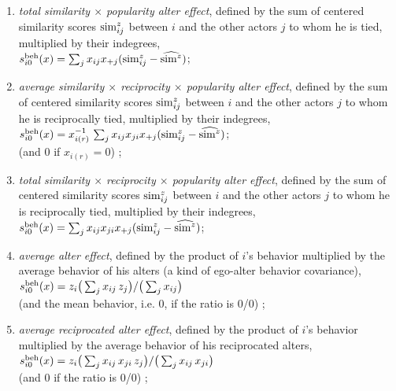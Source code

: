 \documentclass[a4paper,fleqn]{article}
\newcommand{\+}{\, + \,}
\newcommand{\vit}{\theenumi}
\begin{document}
{\begin{enumerate}
 \item
 {\em total similarity  $\times$ popularity alter effect}, defined by the
 sum of centered similarity scores ${\rm sim}^z_{ij}$ between $i$
 and the other actors $j$ to whom he is tied, multiplied by their indegrees,\\
 $s^{\rm beh}_{i\vit}(x) =  \sum_j x_{ij} x_{+j} ({\rm sim}^z_{ij} - \widehat{{\rm sim}^z}) $;

 \item {\em average similarity $\times$ reciprocity $\times$ popularity alter effect}, defined by the
 sum of centered similarity scores ${\rm sim}^z_{ij}$ between $i$
 and the other actors $j$ to whom he is reciprocally tied, multiplied by their indegrees, \\
 $s^{\rm beh}_{i\vit}(x) = x_{i(r)}^{-1} \, \sum_j x_{ij} x_{ji} x_{+j} ({\rm sim}^z_{ij} - \widehat{{\rm sim}^z}) $;\\
 (and 0 if $x_{i(r)} = 0$) ;

 \item {\em total similarity $\times$ reciprocity $\times$ popularity alter effect}, defined by the
 sum of centered similarity scores ${\rm sim}^z_{ij}$ between $i$
 and the other actors $j$ to whom he is reciprocally tied, multiplied by their indegrees,\\
 $s^{\rm beh}_{i\vit}(x) =  \sum_j x_{ij} x_{ji} x_{+j} ({\rm sim}^z_{ij} - \widehat{{\rm sim}^z}) $;

 \item {\em average alter effect}, defined by the product of $i$'s
 behavior multiplied by the average behavior of his alters (a kind
 of ego-alter behavior covariance), \\
 $s^{\rm beh}_{i\vit}(x) =  z_i \big( \sum_j x_{ij}\, z_j \big)
                                / \big (\sum_j x_{ij}\big)  $\\
 (and the mean behavior, i.e. $0$, if the ratio is 0/0) ;

 \item {\em average reciprocated alter effect}, defined by the product of $i$'s
 behavior multiplied by the average behavior of his reciprocated alters, \\
 $s^{\rm beh}_{i\vit}(x) =  z_i \big( \sum_j x_{ij}\, x_{ji}\, z_j \big)
                                / \big (\sum_j x_{ij}\, x_{ji} \big)  $\\
 (and 0 if the ratio is 0/0) ;



\end{enumerate}}
\end{document}
